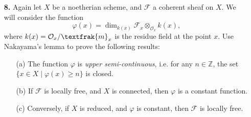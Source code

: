 \documentclass{article}
\newcommand{\goth}[1]{\textfrak{#1}}
\newcommand{\fF}{\mathcal{F}}
\newcommand{\fO}{\mathcal{O}}
\newcommand{\Z}{\mathbb{Z}}
\begin{document}
\begin{enumerate} [label=\textbf{\arabic*.}, leftmargin=0em]
\begin{proof}
\begin{itemize}[leftmargin=0em]
        \item[(b)] The if direction follows from (a). The converse direction follows from the following facts: we can realize finite free modules as a colimit, the stalk of a sheaf is defined as a colimit, and colimits commute.

        \item[(c)] By the previous parts and lemma 2, we reduce to the following algebraic problem: let $A$ be a noetherian local ring with maximal ideal $\goth{m}$, and let $M$ be a finitely generated $A$-module. Then $M \cong A$ if and only if there exists a finitely generated $A$-module $N$ such that $M \otimes_A N \cong A$. One direction is clear. Conversely, suppose $M, N$ are finitely generated $A$-modules such that $M \otimes_A N \cong A$. Let $k = A / \goth{m}$ be the residue field of $A$. Tensoring with $k$ gives
        \begin{equation*}
            (M \otimes_A k) \otimes_k (N \otimes_A k) \cong (M \otimes_A N) \otimes_A k \cong A \otimes_A k \cong k,
        \end{equation*}
        which implies $M \otimes_A k \cong k$. By Nakayama's lemma, $M$ is generated by a single element, which implies $M \cong A / \goth{a}$ for some ideal $\goth{a}$ of $A$, and similarly $N = A / \goth{b}$. We have $$A \cong M \otimes_A N \cong A / \goth{a} \otimes_A A / \goth{b} \cong A / (\goth{a} + \goth{b}),$$
        which implies $\goth{a} + \goth{b} = (0)$. Hence, $M, N \cong A$.
    \end{itemize}
\end{proof}

\item[\textbf{8.}] Again let $X$ be a noetherian scheme, and $\fF$ a coherent sheaf on $X$. We will consider the function
\begin{equation*}
    \varphi(x) = \dim_{k(x)}\fF_x \otimes_{\fO_x} k(x),
\end{equation*}
where $k(x) = \fO_x / \goth{m}_x$ is the residue field at the point $x$. Use Nakayama's lemma to prove the following results:
\begin{itemize} [leftmargin=0cm]
    \item[(a)] The function $\varphi$ is \textit{upper semi-continuous}, i.e. for any $n \in \Z$, the set $\{ x \in X \mid \varphi(x) \geq n\}$ is closed.
    \item[(b)] If $\fF$ is locally free, and $X$ is connected, then $\varphi$ is a constant function.
    \item[(c)] Conversely, if $X$ is reduced, and $\varphi$ is constant, then $\fF$ is locally free.
\end{itemize}


\end{enumerate}
\end{document}
